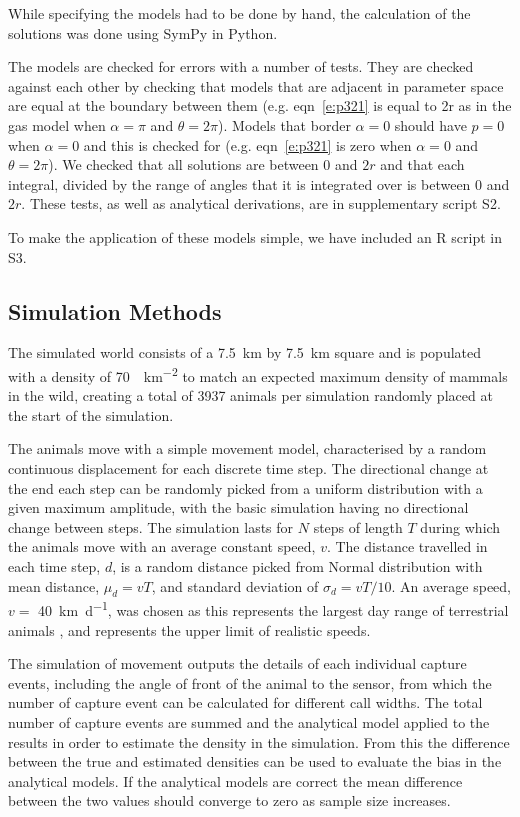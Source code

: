 \documentclass[a4paper,10pt,reqno,oneside]{amsart}
\begin{document}
While specifying the models had to be done by hand, the calculation of the solutions was done using SymPy \citep{sympy} in Python. 

The models are checked for errors with a number of tests. They are checked against each other by checking that models that are adjacent in parameter space are equal at the boundary between them (e.g. eqn~\ref{e:p321} is equal to 2r as in the gas model when $\alpha=\pi$ and $\theta=2\pi$). Models that border $ \alpha = 0$ should have $p = 0$ when $ \alpha = 0$ and this is checked for (e.g. eqn~\ref{e:p321} is zero when $\alpha=0$ and $\theta=2\pi$). We checked that all solutions are between 0 and $2r$ and that each integral, divided by the range of angles that it is integrated over is between 0 and $2r$. These tests, as well as analytical derivations, are in supplementary script S2.


To make the application of these models simple, we have included an R script in S3. 

\subsection{Simulation Methods}

The simulated world consists of a  \SI{7.5}{\kilo\meter} by \SI{7.5}{\kilo\meter} square and is populated with a density of  \SI{70}{\animals\per\kilo\meter\squared} to match an expected maximum density of mammals in the wild\citep{damuth1981population}, creating a total of 3937 animals per simulation randomly placed at the start of the simulation. 

The animals move with a simple movement model, characterised by a random continuous displacement for each discrete time step. The directional change at the end each step can be randomly picked from a uniform distribution with a given maximum amplitude, with the basic simulation having no directional change between steps. The simulation lasts for $N$ steps of length $T$ during which the animals move with an average constant speed, $v$. The distance travelled in each time step, $d$, is a random distance picked from Normal distribution with mean distance, $\mu_d = vT$,  and standard deviation of $\sigma_d = vT/10$. An average speed, $v = $ \SI{40}{\kilo\meter \per \day}, was chosen as this represents the largest day range of terrestrial animals \citep{carbone2005far}, and represents the upper limit of realistic speeds.

The simulation of movement outputs the details of each individual capture events, including the angle of front of the animal to the sensor, from which the number of capture event can be calculated for different call widths. The total number of capture events are summed and the analytical model applied to the results in order to estimate the density in the simulation. From this the difference between the true and estimated densities can be used to evaluate the bias in the analytical models. If the analytical models are correct the mean difference between the two values should converge to zero as sample size increases. 
\end{document}
